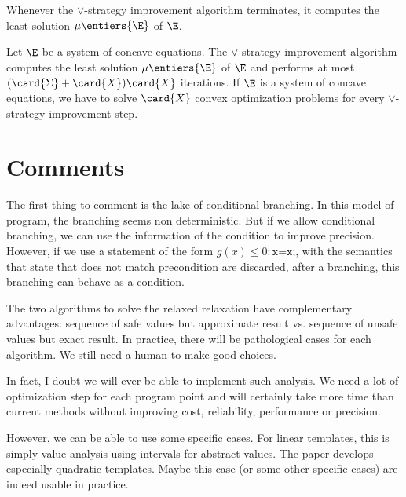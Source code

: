 \documentclass[a4paper, twoside, 10pt]{article}
\begin{document}
\begin{theorem}
    Whenever the $\vee$-strategy improvement algorithm terminates, it computes the least solution $\mu\entiers{\E}$ of $\E$.
\end{theorem}

\begin{theorem}
    Let $\E$ be a system of concave equations. The $\vee$-strategy improvement algorithm computes the least solution $\mu\entiers{\E}$ of $\E$ and performs at most $(\card{\Sigma}+\card{X})\card{X}$ iterations. If $\E$ is a system of concave equations, we have to solve $\card{X}$ convex optimization problems for every $\vee$-strategy improvement step.
\end{theorem}

\section{Comments}

The first thing to comment is the lake of conditional branching. In this model of program, the branching seems non deterministic. But if we allow conditional branching, we can use the information of the condition to improve precision. However, if we use a statement of the form $g(x) \leqslant 0 : \texttt{x=x;}$, with the semantics that state that does not match precondition are discarded, after a branching, this branching can behave as a condition.

The two algorithms to solve the relaxed relaxation have complementary advantages: sequence of safe values but approximate result vs. sequence of unsafe values but exact result. In practice, there will be pathological cases for each algorithm. We still need a human to make good choices.

In fact, I doubt we will ever be able to implement such analysis. We need a lot of optimization step for each program point and will certainly take more time than current methods without improving cost, reliability, performance or precision.

However, we can be able to use some specific cases. For linear templates, this is simply value analysis using intervals for abstract values. The paper develops especially quadratic templates. Maybe this case (or some other specific cases) are indeed usable in practice.
\end{document}
